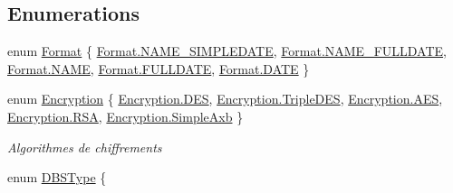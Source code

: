 \subsection*{Enumerations}
\begin{DoxyCompactItemize}
\item 
enum \mbox{\hyperlink{namespace_n_t_k_1_1_database_a9bed700210ca4ed5854002637b664789}{Format}} \{ \newline
\mbox{\hyperlink{namespace_n_t_k_1_1_database_a9bed700210ca4ed5854002637b664789a13f8372a2f91c55558e999c24fa9c969}{Format.\+N\+A\+M\+E\+\_\+\+S\+I\+M\+P\+L\+E\+D\+A\+TE}}, 
\mbox{\hyperlink{namespace_n_t_k_1_1_database_a9bed700210ca4ed5854002637b664789a5b930c23dc95e44f4d7248c2457a722e}{Format.\+N\+A\+M\+E\+\_\+\+F\+U\+L\+L\+D\+A\+TE}}, 
\mbox{\hyperlink{namespace_n_t_k_1_1_database_a9bed700210ca4ed5854002637b664789aad32e604e17467fc435538334fbddf3e}{Format.\+N\+A\+ME}}, 
\mbox{\hyperlink{namespace_n_t_k_1_1_database_a9bed700210ca4ed5854002637b664789aeb9e05255588151fab8ca16be5116d76}{Format.\+F\+U\+L\+L\+D\+A\+TE}}, 
\newline
\mbox{\hyperlink{namespace_n_t_k_1_1_database_a9bed700210ca4ed5854002637b664789a633a6c7a6b9958f8174250094daf1e6a}{Format.\+D\+A\+TE}}
 \}
\item 
enum \mbox{\hyperlink{namespace_n_t_k_1_1_database_aa21afe93187a6c77c4ccdc988b3c4ac2}{Encryption}} \{ \newline
\mbox{\hyperlink{namespace_n_t_k_1_1_database_aa21afe93187a6c77c4ccdc988b3c4ac2a80ac4ad5ef5d93178348c18272df6bd3}{Encryption.\+D\+ES}}, 
\mbox{\hyperlink{namespace_n_t_k_1_1_database_aa21afe93187a6c77c4ccdc988b3c4ac2afd7ed19772feb9e1c97efa84dd795d67}{Encryption.\+Triple\+D\+ES}}, 
\mbox{\hyperlink{namespace_n_t_k_1_1_database_aa21afe93187a6c77c4ccdc988b3c4ac2a76b7593457e2ab50befe2dcd63cf388f}{Encryption.\+A\+ES}}, 
\mbox{\hyperlink{namespace_n_t_k_1_1_database_aa21afe93187a6c77c4ccdc988b3c4ac2a445d0434ad7b42aff5bab616ebb41970}{Encryption.\+R\+SA}}, 
\newline
\mbox{\hyperlink{namespace_n_t_k_1_1_database_aa21afe93187a6c77c4ccdc988b3c4ac2ad975e0475b8301c6f5077bbc5acd4a60}{Encryption.\+Simple\+Axb}}
 \}
\begin{DoxyCompactList}\small\item\em Algorithmes de chiffrements \end{DoxyCompactList}\item 
enum \mbox{\hyperlink{namespace_n_t_k_1_1_database_ae934a2911c3962eb3163e7e1758e8a01}{D\+B\+S\+Type}} \{ \newline

\end{DoxyCompactItemize}
